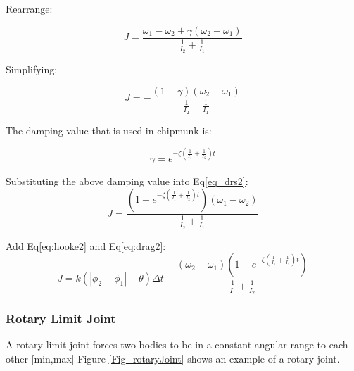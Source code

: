 \documentclass[12pt]{article}
\begin{document}
\noindent
Rearrange: 

\begin{equation*}
J= \frac{\omega_\text{1} - \omega_\text{2} + \gamma( \omega_\text{2} -
\omega_\text{1})}{\frac{1}{I_\text{2}} + \frac{1}{I_\text{1}}}
\end{equation*}

\noindent
Simplifying:

\begin{equation}
J= -\frac{(1-\gamma)(\omega_\text{2} - \omega_\text{1})}{\frac{1}{I_\text{2}} +
\frac{1}{I_\text{1}}} \label{eq_drs2}
\end{equation}
 
\noindent
The damping value that is used in chipmunk is:

\begin{equation*}
\gamma = e^{-\zeta(\frac{1}{I_\text{1}} + \frac{1}{I_\text{2}})t}
\end{equation*}

\noindent
Substituting the above damping value into Eq\ref{eq_drs2}:
\begin{equation}
J= \frac{(1- e^{-\zeta(\frac{1}{I_\text{1}} +
\frac{1}{I_\text{2}})t})(\omega_\text{1} -
\omega_\text{2})}{\frac{1}{I_\text{2}} + \frac{1}{I_\text{1}}} \label{eq:drag2}
\end{equation}

\noindent 
Add   Eq\ref{eq:hooke2} and Eq\ref{eq:drag2}: 
\begin{equation*}
J= k(| \phi_\text{2} - \phi_\text{1}| - \theta)\Delta t - \frac{(\omega_\text{2}
- \omega_\text{1}) (1 - e^{-\zeta (\frac{1}{I_\text{1}} + \frac{1}{I_\text{2}})
t})}{\frac{1}{I_\text{1}} + \frac{1}{I_\text{2}}}
\end{equation*}

\subsubsection{Rotary Limit Joint} \label{SecConstraintFig}
A rotary limit joint forces two bodies to be in a constant angular range to each
other
[min,max]
Figure \ref{Fig_rotaryJoint} shows an example of a rotary joint.
~\newline
\end{document}
